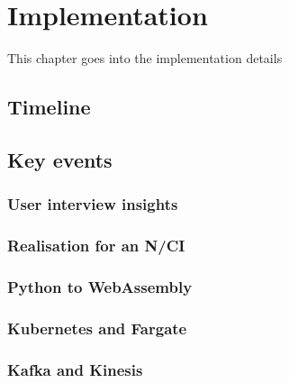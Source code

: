 \chapter{Implementation}
\graphicspath{{Chapter4/Figs/}{Chapter4/Figs/}}

This chapter goes into the implementation details

\section{Timeline}
\label{chapter4-timeline}

\section{Key events}
\label{chapter4-key-events}

\subsection{User interview insights}
\label{chapter4-user-interview-insights}

\subsection{Realisation for an N/CI}
\label{chapter4-realisation-for-an-nci}

\subsection{Python to WebAssembly}
\label{chapter4-python-to-webassembly}

\subsection{Kubernetes and Fargate}
\label{chapter4-kubernetes-and-aws-fargate}

\subsection{Kafka and Kinesis}
\label{chapter4-kafka-aws-kinesis}

